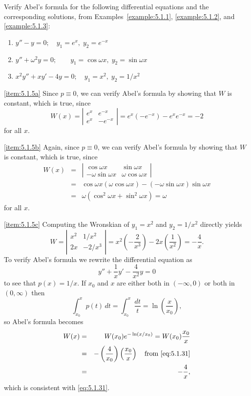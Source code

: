 \documentclass{ximera}
\begin{document}
\begin{example}\label{example:5.1.5}
Verify Abel's formula for the following differential equations and the
corresponding solutions, from  Examples~\ref{example:5.1.1},
\ref{example:5.1.2}, and \ref{example:5.1.3}:
\begin{enumerate}
\item\label{item:5.1.5a} %
$y''-y=0;\quad  y_1=e^x,\;  y_2=e^{-x}$
\item\label{item:5.1.5b}%
$y''+\omega^2y=0;\quad \quad y_1=\cos\omega x,\;  y_2=\sin\omega x$
\item\label{item:5.1.5c}%
$x^2y''+xy'-4y=0;\quad  y_1=x^2,\;  y_2=1/x^2$
\end{enumerate}
\begin{explanation}
\ref{item:5.1.5a} Since $p\equiv0$, we can verify Abel's formula
by showing that $W$ is constant, which is true, since
$$
W(x)=\left| \begin{array}{rr}
e^x & e^{-x} \\
e^x & -e^{-x}
\end{array} \right|=e^x(-e^{-x})-e^xe^{-x}=-2
$$
for all $x$.

\ref{item:5.1.5b} Again, since $p\equiv0$, we can verify Abel's
formula
by showing that $W$ is constant, which is true, since
\begin{eqnarray*}
W(x)&=&\left| \begin{array}{cc}
\cos\omega x & \sin\omega x \\
-\omega\sin\omega x &\omega\cos\omega x
\end{array} \right|\\
&=&\cos\omega x (\omega\cos\omega x)-(-\omega\sin\omega x)\sin\omega
x\\ &=&\omega(\cos^2\omega x+\sin^2\omega x)=\omega
\end{eqnarray*}
for all $x$.

\ref{item:5.1.5c}
Computing the Wronskian of $y_1=x^2$ and
$y_2=1/x^2$ directly yields
\begin{equation}\label{eq:5.1.31}
W=\left| \begin{array}{cc}
x^2 & 1/x^2 \\
2x & -2/x^3
\end{array} \right|=x^2\left(-\frac{2}{x^3}\right)-2x\left(\frac{1}{x^2}\right)
=-\frac{4}{x}.
\end{equation}
To verify Abel's formula we
rewrite the differential  equation as
$$
y''+\frac{1}{x}y'-\frac{4}{x^2}y=0
$$
to see  that $p(x)=1/x$. If $x_0$ and $x$ are either both in
$(-\infty,0)$ or both in $(0,\infty)$ then
$$
\int_{x_0}^x p(t)\,dt=\int_{x_0}^x \frac{dt}{t}=\ln\left(\frac{x}{x_0}
\right),
$$
so Abel's formula becomes
\begin{eqnarray*}
W(x)&=&W(x_0)e^{-\ln(x/x_0)}=W(x_0)\frac{x_0}{x}\\
&=&-\left(\frac{4}{x_0}\right)\left(\frac{x_0}{x}\right)\quad\mbox{from
\eqref{eq:5.1.31}}\\
&=&-\frac{4}{x},
\end{eqnarray*}
which is consistent with \eqref{eq:5.1.31}.
\end{explanation}
\end{example}
\end{document}
